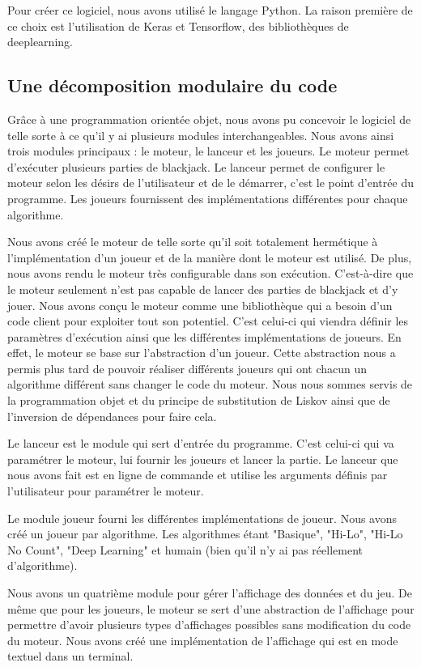 Pour créer ce logiciel, nous avons utilisé le langage Python. La raison première de ce choix est l'utilisation de Keras et Tensorflow, des bibliothèques de deeplearning. 

\subsection{Une décomposition modulaire du code}

Grâce à une programmation orientée objet, nous avons pu concevoir le logiciel de telle sorte à ce qu'il y ai plusieurs modules interchangeables. Nous avons ainsi trois modules principaux : le moteur, le lanceur et les joueurs. Le moteur permet d'exécuter plusieurs parties de blackjack. Le lanceur permet de configurer le moteur selon les désirs de l'utilisateur et de le démarrer, c'est le point d'entrée du programme. Les joueurs fournissent des implémentations différentes pour chaque algorithme.

Nous avons créé le moteur de telle sorte qu'il soit totalement hermétique à l'implémentation d'un joueur et de la manière dont le moteur est utilisé. De plus, nous avons rendu le moteur très configurable dans son exécution. C'est-à-dire que le moteur seulement n'est pas capable de lancer des parties de blackjack et d'y jouer. Nous avons conçu le moteur comme une bibliothèque qui a besoin d'un code client pour exploiter tout son potentiel. C'est celui-ci qui viendra définir les paramètres d'exécution ainsi que les différentes implémentations de joueurs.
En effet, le moteur se base sur l'abstraction d'un joueur. Cette abstraction nous a permis plus tard de pouvoir réaliser différents joueurs qui ont chacun un algorithme différent sans changer le code du moteur. Nous nous sommes servis de la programmation objet et du principe de substitution de Liskov ainsi que de l'inversion de dépendances pour faire cela.

Le lanceur est le module qui sert d'entrée du programme. C'est celui-ci qui va paramétrer le moteur, lui fournir les joueurs et lancer la partie. Le lanceur que nous avons fait est en ligne de commande et utilise les arguments définis par l'utilisateur pour paramétrer le moteur.

Le module joueur fourni les différentes implémentations de joueur. Nous avons créé un joueur par algorithme. Les algorithmes étant "Basique", "Hi-Lo", "Hi-Lo No Count", "Deep Learning" et humain (bien qu'il n'y ai pas réellement d'algorithme).

Nous avons un quatrième module pour gérer l'affichage des données et du jeu. De même que pour les joueurs, le moteur se sert d'une abstraction de l'affichage pour permettre d'avoir plusieurs types d'affichages possibles sans modification du code du moteur. Nous avons créé une implémentation de l'affichage qui est en mode textuel dans un terminal.

